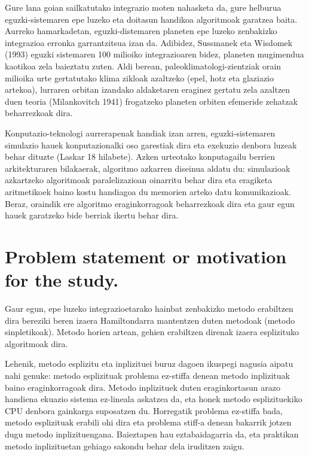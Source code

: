 Gure lana goian sailkatutako integrazio moten nahasketa da, gure helburua eguzki-sistemaren epe luzeko eta doitasun handikoa algoritmoak garatzea baita. Aurreko hamarkadetan, eguzki-distemaren planeten epe luzeko zenbakizko integrazioa erronka garrantzitsua izan da. Adibidez, Sussmanek eta Wisdomek (1993) \cite{Sussman1992} eguzki sistemaren 100 milioiko integrazioaren bidez, planeten mugimendua kaotikoa zela baieztatu zuten. Aldi berean, paleoklimatologi-zientziak orain milioika urte gertatutako klima zikloak  azaltzeko (epel, hotz eta glaziazio artekoa), lurraren orbitan izandako aldaketaren eraginez gertatu zela azaltzen duen teoria (Milankovitch 1941) \cite{Berger2012} frogatzeko planeten orbiten efemeride zehatzak beharrezkoak dira.        

Konputazio-teknologi aurrerapenak handiak izan arren, eguzki-sistemaren simulazio hauek konputazionalki oso garestiak dira eta exekuzio denbora luzeak behar dituzte (Laskar  18 hilabete). Azken urteotako konputagailu berrien arkitekturaren bilakaerak, algoritmo azkarren diseinua aldatu du: simulazioak azkartzeko algoritmoak paralelizazioan oinarritu behar dira eta eragiketa aritmetikoek baino kostu handiagoa du memorien arteko datu komunikazioak. Beraz, oraindik ere algoritmo eraginkorragoak beharrezkoak dira eta gaur egun hauek garatzeko bide berriak ikertu behar dira.


\section{Problem statement or motivation for the study.}
\label{intro}

Gaur egun, epe luzeko integrazioetarako hainbat zenbakizko metodo erabiltzen dira bereziki beren izaera Hamiltondarra mantentzen duten metodoak (metodo sinpletikoak). Metodo horien artean, gehien erabiltzen direnak izaera esplizituko algoritmoak dira.

Lehenik, metodo esplizitu eta inplizituei buruz dagoen ikuspegi nagusia aipatu nahi genuke:  metodo esplizituak problema ez-stiffa denean metodo inplizituak baino eraginkorragoak dira. Metodo inplizituek duten eraginkortasun arazo handiena ekuazio sistema ez-lineala askatzea da, eta honek metodo esplizituekiko CPU denbora gainkarga suposatzen du. Horregatik problema ez-stiffa bada, metodo esplizituak erabili ohi dira eta problema stiff-a denean bakarrik jotzen dugu metodo inplizituengana. Baieztapen hau eztabaidagarria da, eta praktikan metodo inplizituetan gehiago sakondu behar dela iruditzen zaigu. 

